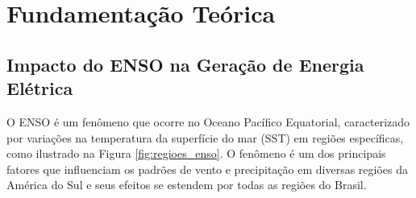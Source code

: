 



\chapter{Fundamentação Teórica}
\section{Impacto do ENSO na Geração de Energia Elétrica}
O ENSO é um fenômeno que ocorre no Oceano Pacífico Equatorial, caracterizado por variações na temperatura da superfície
do mar (SST) em regiões específicas, como ilustrado na Figura \ref{fig:regioes_enso}. O fenômeno é um dos principais fatores 
que influenciam os padrões de vento e precipitação em diversas regiões da América do Sul e seus efeitos se estendem por 
todas as regiões do Brasil. \cite{Andreoli2016}

\begin{figure}[!ht]
	{}
	{}
\end{figure}

